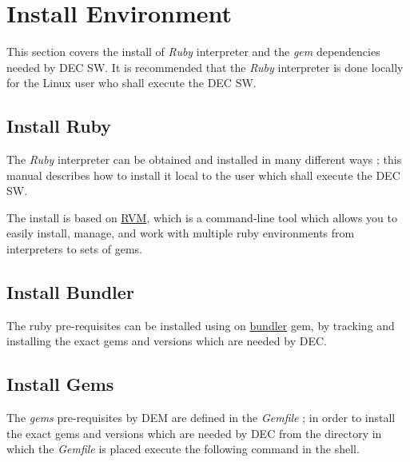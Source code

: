 \documentclass[dec_sum_main.tex]{subfiles}
\begin{document}
\section{Install Environment}

This section covers the install of \textit{Ruby} interpreter and the \textit{gem} dependencies needed by DEC SW. It is recommended that the \textit{Ruby} interpreter is done locally for the Linux user who shall execute the DEC SW.

\par
\noindent

\subsection{Install Ruby}
 
The \textit{Ruby} interpreter can be obtained and installed in many different ways ; this manual describes how to install it local to the user which shall execute the DEC SW.

\par
\noindent
The install is based on \href{https://rvm.io/}{RVM}, which is a command-line tool which allows you to easily install, manage, and work with multiple ruby environments from interpreters to sets of gems. 

\par
{}

\subsection{Install Bundler}

\par
\noindent
The ruby pre-requisites can be installed using on \href{https://bundler.io/}{bundler} gem, by tracking and installing the exact gems and versions which are needed by DEC. 

\par
{}

\subsection{Install Gems}

\par
\noindent
The \textit{gems} pre-requisites by DEM are defined in the \textit{Gemfile} ; in order to install the exact gems and versions which are needed by DEC from the directory in which the \textit{Gemfile} is placed execute the following command in the shell. 
\end{document}
